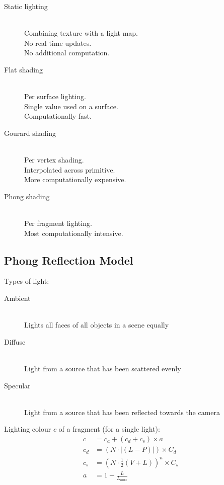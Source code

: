 \documentclass[a4paper]{article}
\begin{document}
\begin{description}
  \item[Static lighting] \hfill \\
    Combining texture with a light map. \\
    No real time updates. \\
    No additional computation.

  \item[Flat shading] \hfill \\
    Per surface lighting. \\
    Single value used on a surface. \\
    Computationally fast.

  \item[Gourard shading] \hfill \\
    Per vertex shading. \\
    Interpolated across primitive. \\
    More computationally expensive.

  \item[Phong shading] \hfill \\
    Per fragment lighting. \\
    Most computationally intensive.

\end{description}

\subsection{Phong Reflection Model}

Types of light:

\begin{description}
  \item[Ambient] \hfill \\
    Lights all faces of all objects in a scene equally

  \item[Diffuse] \hfill \\
    Light from a source that has been scattered evenly

  \item[Specular] \hfill \\
    Light from a source that has been reflected towards the camera

\end{description}

Lighting colour $c$ of a fragment (for a single light):
\begin{align*}
  c &= c_{a} + (c_{d} + c_{s}) \times a \\
  c_{d} &= (N \cdot |(L - P)|) \times C_{d} \\
  c_{s} &= (N \cdot \frac{1}{2}(V + L))^{n} \times C_{s}\\
  a &= 1 - \frac{L}{L_{max}}
\end{align*}
\end{document}
